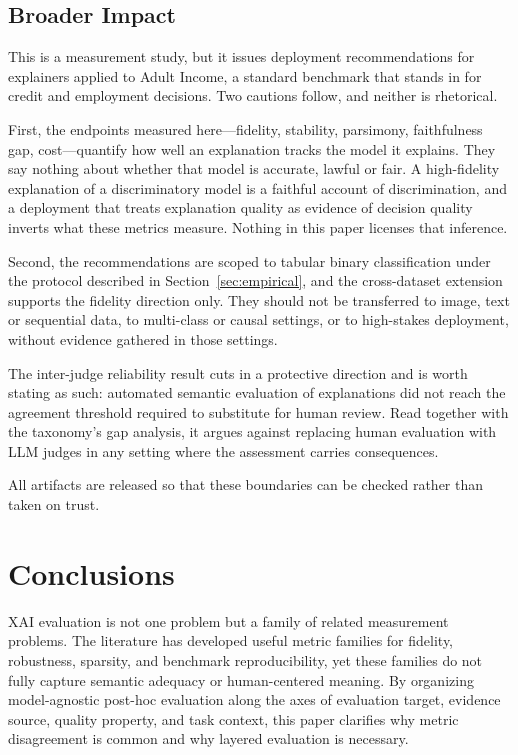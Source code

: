 \documentclass[10pt,a4paper,twoside]{article}
\begin{document}
\subsection{Broader Impact}
\label{sec:broader_impact}


This is a measurement study, but it issues deployment recommendations for
explainers applied to Adult Income, a standard benchmark that stands in for
credit and employment decisions. Two cautions follow, and neither is
rhetorical.

First, the endpoints measured here---fidelity, stability, parsimony,
faithfulness gap, cost---quantify how well an explanation tracks the model it
explains. They say nothing about whether that model is accurate, lawful or
fair. A high-fidelity explanation of a discriminatory model is a faithful
account of discrimination, and a deployment that treats explanation quality as
evidence of decision quality inverts what these metrics measure. Nothing in
this paper licenses that inference.

Second, the recommendations are scoped to tabular binary classification under
the protocol described in Section~\ref{sec:empirical}, and the cross-dataset
extension supports the fidelity direction only. They should not be transferred
to image, text or sequential data, to multi-class or causal settings, or to
high-stakes deployment, without evidence gathered in those settings.

The inter-judge reliability result cuts in a protective direction and is worth
stating as such: automated semantic evaluation of explanations did not reach
the agreement threshold required to substitute for human review. Read together
with the taxonomy's gap analysis, it argues against replacing human evaluation
with LLM judges in any setting where the assessment carries consequences.

All artifacts are released so that these boundaries can be checked rather than
taken on trust.

\section{Conclusions}
\label{sec:conclusion}

XAI evaluation is not one problem but a family of related measurement
problems. The literature has developed useful metric families for fidelity,
robustness, sparsity, and benchmark reproducibility, yet these families do
not fully capture semantic adequacy or human-centered meaning. By
organizing model-agnostic post-hoc evaluation along the axes of evaluation
target, evidence source, quality property, and task context, this paper
clarifies why metric disagreement is common and why layered evaluation is
necessary.
\end{document}
